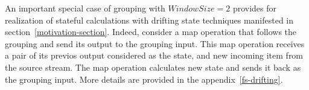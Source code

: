 




An important special case of grouping with $Window Size = 2$  provides for realization of stateful calculations with drifting state techniques manifested in section~\ref{motivation-section}.  
Indeed, consider a map operation that follows the grouping and send its output to the grouping input. This map operation receives a pair of its previos output considered as the state, and new incoming item from the source stream. The map operation calculates new state and sends it back as the grouping input. 
More details are provided in the appendix~\ref{fs-drifting}.



